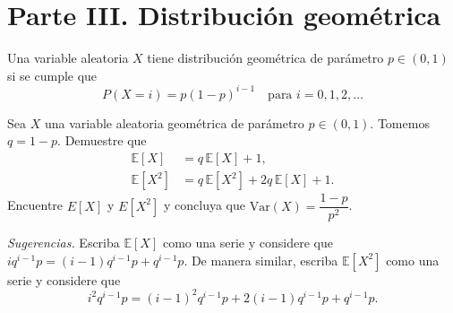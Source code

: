\documentclass[12pt,a4paper]{article}
\begin{document}
    \section*{Parte III. Distribución geométrica}

    Una variable aleatoria $X$ tiene distribución geométrica de parámetro $p \in (0,1)$ si se cumple que
    \begin{equation*}
        P(X = i) = p(1-p)^{i-1} \quad \text{para } i = 0, 1, 2, \ldots
    \end{equation*}

    \begin{mdframed}[style=mdpinkbox, frametitle={Ejercicio 4}]
        Sea $X$ una variable aleatoria geométrica de parámetro $p \in (0,1)$. Tomemos $q = 1 - p$.
        Demuestre que
        \begin{align*}
            \mathbb{E}[X]   &= q\,\mathbb{E}[X] + 1, \\
            \mathbb{E}[X^2] &= q\,\mathbb{E}[X^2] + 2q\,\mathbb{E}[X] + 1.
        \end{align*}
        Encuentre $E[X]$ y $E[X^2]$ y concluya que $\mathrm{Var}(X) = \dfrac{1-p}{p^2}$.

        \medskip
        \noindent\textit{Sugerencias.} Escriba $\mathbb{E}[X]$ como una serie y considere que
        $i q^{i-1} p = (i-1)q^{i-1}p + q^{i-1}p$. De manera similar, escriba $\mathbb{E}[X^2]$
        como una serie y considere que
        \begin{equation*}
            i^2 q^{i-1} p = (i-1)^2 q^{i-1}p + 2(i-1)q^{i-1}p + q^{i-1}p.
        \end{equation*}
    \end{mdframed}
\end{document}
